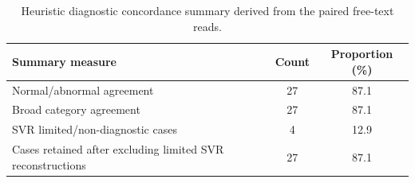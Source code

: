 \begin{table}[htbp]
\centering
\caption{Heuristic diagnostic concordance summary derived from the paired free-text reads.}
\label{tab:diagnostic_summary}
\begin{tabular}{lcc}
\toprule
Summary measure & Count & Proportion (\%) \\
\midrule
Normal/abnormal agreement & 27 & 87.1 \\
Broad category agreement & 27 & 87.1 \\
SVR limited/non-diagnostic cases & 4 & 12.9 \\
Cases retained after excluding limited SVR reconstructions & 27 & 87.1 \\
\bottomrule
\end{tabular}
\end{table}

